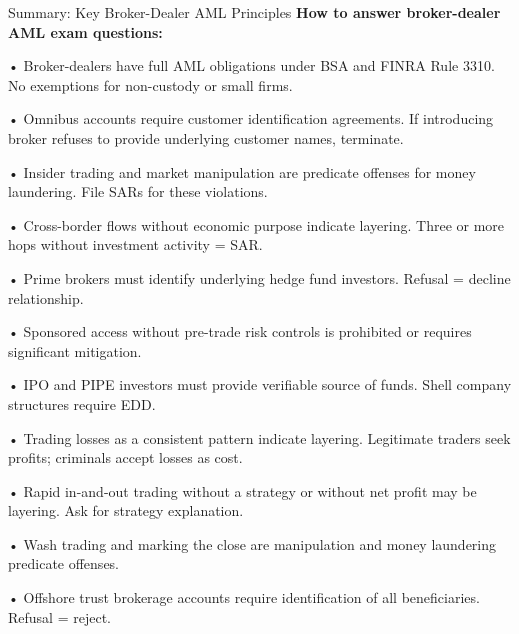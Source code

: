 \documentclass[11pt,a4paper]{beamer}
\begin{document}
\begin{frame}{Summary: Key Broker-Dealer AML Principles}
\tiny
\noindent\textbf{How to answer broker-dealer AML exam questions:}

\vspace{0.1cm}
\noindent• Broker-dealers have full AML obligations under BSA and FINRA Rule 3310. No exemptions for non-custody or small firms.

\vspace{0.1cm}
\noindent• Omnibus accounts require customer identification agreements. If introducing broker refuses to provide underlying customer names, terminate.

\vspace{0.1cm}
\noindent• Insider trading and market manipulation are predicate offenses for money laundering. File SARs for these violations.

\vspace{0.1cm}
\noindent• Cross-border flows without economic purpose indicate layering. Three or more hops without investment activity = SAR.

\vspace{0.1cm}
\noindent• Prime brokers must identify underlying hedge fund investors. Refusal = decline relationship.

\vspace{0.1cm}
\noindent• Sponsored access without pre-trade risk controls is prohibited or requires significant mitigation.

\vspace{0.1cm}
\noindent• IPO and PIPE investors must provide verifiable source of funds. Shell company structures require EDD.

\vspace{0.1cm}
\noindent• Trading losses as a consistent pattern indicate layering. Legitimate traders seek profits; criminals accept losses as cost.

\vspace{0.1cm}
\noindent• Rapid in-and-out trading without a strategy or without net profit may be layering. Ask for strategy explanation.

\vspace{0.1cm}
\noindent• Wash trading and marking the close are manipulation and money laundering predicate offenses.

\vspace{0.1cm}
\noindent• Offshore trust brokerage accounts require identification of all beneficiaries. Refusal = reject.


\end{frame}
\end{document}
